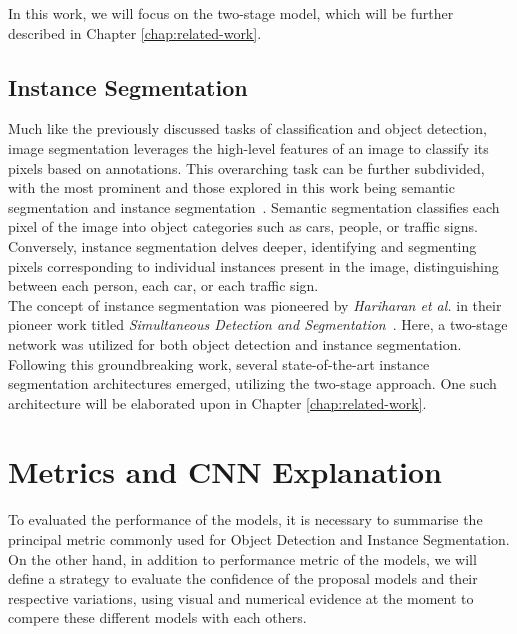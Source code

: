 In this work, we will focus on the two-stage model, which will be further described in Chapter \ref{chap:related-work}.

\subsection{Instance Segmentation}

Much like the previously discussed tasks of classification and object detection, image segmentation leverages the high-level features of an image to classify its pixels based on annotations. This overarching task can be further subdivided, with the most prominent and those explored in this work being semantic segmentation and instance segmentation~\cite{9356353, GU2022104401}. Semantic segmentation classifies each pixel of the image into object categories such as cars, people, or traffic signs. Conversely, instance segmentation delves deeper, identifying and segmenting pixels corresponding to individual instances present in the image, distinguishing between each person, each car, or each traffic sign.\\

The concept of instance segmentation was pioneered by \textit{Hariharan et al.} in their pioneer work titled \textit{Simultaneous Detection and Segmentation}~\cite{10.1007/978-3-319-10584-0_20}. Here, a two-stage network was utilized for both object detection and instance segmentation. Following this groundbreaking work, several state-of-the-art instance segmentation architectures emerged, utilizing the two-stage approach. One such architecture will be elaborated upon in Chapter \ref{chap:related-work}.

\section{Metrics and CNN Explanation}
To evaluated the performance of the models, it is necessary to summarise the principal metric commonly used for Object Detection and Instance Segmentation. On the other hand, in addition to performance metric of the models, we will define a strategy to evaluate the confidence of the proposal models and their respective variations, using visual and numerical evidence at the moment to compere these different models with each others.

